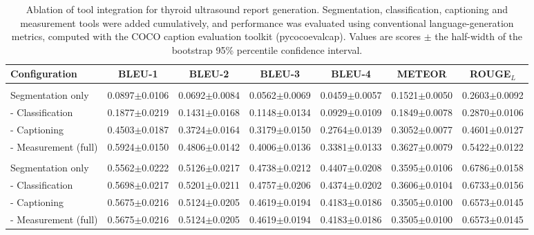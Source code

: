 \begin{table}[p]
\centering
\begin{threeparttable}

\caption{Ablation of tool integration for thyroid ultrasound report generation. Segmentation, classification, captioning and measurement tools were added cumulatively, and performance was evaluated using conventional language-generation metrics, computed with the COCO caption evaluation toolkit (pycocoevalcap). Values are scores $\pm$ the half-width of the bootstrap 95\% percentile confidence interval.}
\label{tab:report_generation_tool_ablation}

\footnotesize
\setlength{\tabcolsep}{5.0pt}
\renewcommand{\arraystretch}{1.08}

\begin{tabular}{lcccccc}
\toprule
\textbf{Configuration}
& \textbf{BLEU-1}
& \textbf{BLEU-2}
& \textbf{BLEU-3}
& \textbf{BLEU-4}
& \textbf{METEOR}
& \textbf{ROUGE$_L$} \\
\midrule

\rowcolor{gray!20}
\multicolumn{7}{c}{\textbf{SMU-HMC Testset} ($n=400$)} \\
Segmentation only
& 0.0897$\pm$0.0106
& 0.0692$\pm$0.0084
& 0.0562$\pm$0.0069
& 0.0459$\pm$0.0057
& 0.1521$\pm$0.0050
& 0.2603$\pm$0.0092 \\
- Classification
& 0.1877$\pm$0.0219
& 0.1431$\pm$0.0168
& 0.1148$\pm$0.0134
& 0.0929$\pm$0.0109
& 0.1849$\pm$0.0078
& 0.2870$\pm$0.0106 \\
- Captioning
& 0.4503$\pm$0.0187
& 0.3724$\pm$0.0164
& 0.3179$\pm$0.0150
& 0.2764$\pm$0.0139
& 0.3052$\pm$0.0077
& 0.4601$\pm$0.0127 \\
- Measurement (full)
& 0.5924$\pm$0.0150
& 0.4806$\pm$0.0142
& 0.4006$\pm$0.0136
& 0.3381$\pm$0.0133
& 0.3627$\pm$0.0079
& 0.5422$\pm$0.0122 \\

\midrule
\rowcolor{gray!20}
\multicolumn{7}{c}{\textbf{KMVE Testset} ($n=492$)} \\
Segmentation only
& 0.5562$\pm$0.0222
& 0.5126$\pm$0.0217
& 0.4738$\pm$0.0212
& 0.4407$\pm$0.0208
& 0.3595$\pm$0.0106
& 0.6786$\pm$0.0158 \\
- Classification
& 0.5698$\pm$0.0217
& 0.5201$\pm$0.0211
& 0.4757$\pm$0.0206
& 0.4374$\pm$0.0202
& 0.3606$\pm$0.0104
& 0.6733$\pm$0.0156 \\
- Captioning
& 0.5675$\pm$0.0216
& 0.5124$\pm$0.0205
& 0.4619$\pm$0.0194
& 0.4183$\pm$0.0186
& 0.3505$\pm$0.0100
& 0.6573$\pm$0.0145 \\
- Measurement (full)
& 0.5675$\pm$0.0216
& 0.5124$\pm$0.0205
& 0.4619$\pm$0.0194
& 0.4183$\pm$0.0186
& 0.3505$\pm$0.0100
& 0.6573$\pm$0.0145 \\


\end{tabular}
\end{threeparttable}
\end{table}
